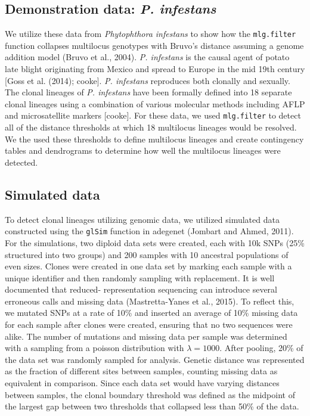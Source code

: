 \documentclass{frontiersSCNS} %
\begin{document}
\subsection*{\texorpdfstring{Demonstration data: \emph{P.
infestans}}{Demonstration data: P. infestans}}\label{demonstration-data-p.-infestans}

We utilize these data from \emph{Phytophthora infestans} to show how the
\texttt{mlg.filter} function collapses multilocus genotypes with Bruvo's
distance assuming a genome addition model (Bruvo et al., 2004). \emph{P.
infestans} is the causal agent of potato late blight originating from
Mexico and spread to Europe in the mid 19th century {[}Goss et al.
(2014); cooke{]}. \emph{P. infestans} reproduces both clonally and
sexually. The clonal lineages of \emph{P. infestans} have been formally
defined into 18 separate clonal lineages using a combination of various
molecular methods including AFLP and microsatellite markers {[}cooke{]}.
For these data, we used \texttt{mlg.filter} to detect all of the
distance thresholds at which 18 multilocus lineages would be resolved.
We the used these thresholds to define multilocus lineages and create
contingency tables and dendrograms to determine how well the multilocus
lineages were detected.

\subsection*{Simulated data}\label{simulated-data}

To detect clonal lineages utilizing genomic data, we utilized simulated
data constructed using the \texttt{glSim} function in adegenet (Jombart
and Ahmed, 2011). For the simulations, two diploid data sets were
created, each with 10k SNPs (25\% structured into two groups) and 200
samples with 10 ancestral populations of even sizes. Clones were created
in one data set by marking each sample with a unique identifier and then
randomly sampling with replacement. It is well documented that reduced-
representation sequencing can introduce several erroneous calls and
missing data (Mastretta-Yanes et al., 2015). To reflect this, we mutated
SNPs at a rate of 10\% and inserted an average of 10\% missing data for
each sample after clones were created, ensuring that no two sequences
were alike. The number of mutations and missing data per sample was
determined with a sampling from a poisson distribution with
\(\lambda = 1000\). After pooling, 20\% of the data set was randomly
sampled for analysis. Genetic distance was represented as the fraction
of different sites between samples, counting missing data as equivalent
in comparison. Since each data set would have varying distances between
samples, the clonal boundary threshold was defined as the midpoint of
the largest gap between two thresholds that collapsed less than 50\% of
the data.
\end{document}
